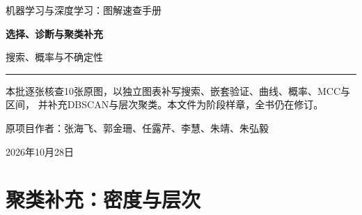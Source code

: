 \documentclass[a4paper,11pt,oneside,openany]{book}
\begin{document}
\frontmatter
\hypersetup{pageanchor=false}
\begin{titlepage}
\vspace*{16mm}
{\sffamily\color{Teal}\large 机器学习与深度学习：图解速查手册\par}
\vspace{15mm}
{\sffamily\bfseries\color{Ink}\Huge 选择、诊断与聚类补充\par}
\vspace{6mm}
{\sffamily\color{Ink}\LARGE 搜索、概率与不确定性\par}
\vspace{12mm}
\noindent\textcolor{Teal}{\rule{\textwidth}{1.2pt}}
\vspace{7mm}
\begin{keyidea}[第十二批阶段样章]
本批逐张核查10张原图，以独立图表补写搜索、嵌套验证、曲线、概率、MCC与区间，
并补充DBSCAN与层次聚类。本文件为阶段样章，全书仍在修订。
\end{keyidea}
\vfill
原项目作者：张海飞、郭金珊、任露芹、李慧、朱靖、朱弘毅\par
\vspace{4mm}
2026年10月28日\par
\end{titlepage}
\hypersetup{pageanchor=true}
\tableofcontents
\mainmatter
\setcounter{chapter}{3}

\chapter{聚类补充：密度与层次}

\end{document}
